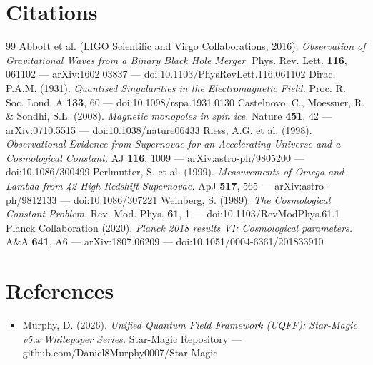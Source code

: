 \documentclass[12pt,a4paper]{article}
\begin{document}
\section*{Citations}
\begin{thebibliography}{99}
 Abbott et al. (LIGO Scientific and Virgo Collaborations, 2016). \emph{Observation of Gravitational Waves from a Binary Black Hole Merger.} Phys. Rev. Lett. \textbf{116}, 061102 --- arXiv:1602.03837 --- doi:10.1103/PhysRevLett.116.061102
 Dirac, P.A.M. (1931). \emph{Quantised Singularities in the Electromagnetic Field.} Proc. R. Soc. Lond. A \textbf{133}, 60 --- doi:10.1098/rspa.1931.0130
 Castelnovo, C., Moessner, R. \& Sondhi, S.L. (2008). \emph{Magnetic monopoles in spin ice.} Nature \textbf{451}, 42 --- arXiv:0710.5515 --- doi:10.1038/nature06433
 Riess, A.G. et al. (1998). \emph{Observational Evidence from Supernovae for an Accelerating Universe and a Cosmological Constant.} AJ \textbf{116}, 1009 --- arXiv:astro-ph/9805200 --- doi:10.1086/300499
 Perlmutter, S. et al. (1999). \emph{Measurements of Omega and Lambda from 42 High-Redshift Supernovae.} ApJ \textbf{517}, 565 --- arXiv:astro-ph/9812133 --- doi:10.1086/307221
 Weinberg, S. (1989). \emph{The Cosmological Constant Problem.} Rev. Mod. Phys. \textbf{61}, 1 --- doi:10.1103/RevModPhys.61.1
 Planck Collaboration (2020). \emph{Planck 2018 results VI: Cosmological parameters.} A\&A \textbf{641}, A6 --- arXiv:1807.06209 --- doi:10.1051/0004-6361/201833910
\end{thebibliography}

\section*{References}
\begin{itemize}
  \item[2.] Murphy, D. (2026). \emph{Unified Quantum Field Framework (UQFF): Star-Magic v5.x Whitepaper Series.} Star-Magic Repository --- github.com/Daniel8Murphy0007/Star-Magic
\end{itemize}

\end{document}
